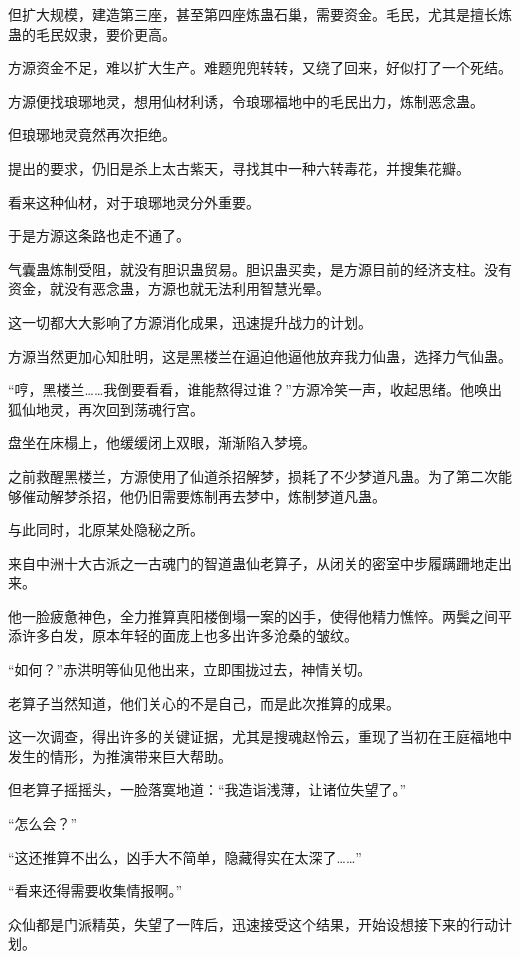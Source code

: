 \begin{this_body}
但扩大规模，建造第三座，甚至第四座炼蛊石巢，需要资金。毛民，尤其是擅长炼蛊的毛民奴隶，要价更高。

方源资金不足，难以扩大生产。难题兜兜转转，又绕了回来，好似打了一个死结。

方源便找琅琊地灵，想用仙材利诱，令琅琊福地中的毛民出力，炼制恶念蛊。

但琅琊地灵竟然再次拒绝。

提出的要求，仍旧是杀上太古紫天，寻找其中一种六转毒花，并搜集花瓣。

看来这种仙材，对于琅琊地灵分外重要。

于是方源这条路也走不通了。

气囊蛊炼制受阻，就没有胆识蛊贸易。胆识蛊买卖，是方源目前的经济支柱。没有资金，就没有恶念蛊，方源也就无法利用智慧光晕。

这一切都大大影响了方源消化成果，迅速提升战力的计划。

方源当然更加心知肚明，这是黑楼兰在逼迫他逼他放弃我力仙蛊，选择力气仙蛊。

“哼，黑楼兰……我倒要看看，谁能熬得过谁？”方源冷笑一声，收起思绪。他唤出狐仙地灵，再次回到荡魂行宫。

盘坐在床榻上，他缓缓闭上双眼，渐渐陷入梦境。

之前救醒黑楼兰，方源使用了仙道杀招解梦，损耗了不少梦道凡蛊。为了第二次能够催动解梦杀招，他仍旧需要炼制再去梦中，炼制梦道凡蛊。

与此同时，北原某处隐秘之所。

来自中洲十大古派之一古魂门的智道蛊仙老算子，从闭关的密室中步履蹒跚地走出来。

他一脸疲惫神色，全力推算真阳楼倒塌一案的凶手，使得他精力憔悴。两鬓之间平添许多白发，原本年轻的面庞上也多出许多沧桑的皱纹。

“如何？”赤洪明等仙见他出来，立即围拢过去，神情关切。

老算子当然知道，他们关心的不是自己，而是此次推算的成果。

这一次调查，得出许多的关键证据，尤其是搜魂赵怜云，重现了当初在王庭福地中发生的情形，为推演带来巨大帮助。

但老算子摇摇头，一脸落寞地道：“我造诣浅薄，让诸位失望了。”

“怎么会？”

“这还推算不出么，凶手大不简单，隐藏得实在太深了……”

“看来还得需要收集情报啊。”

众仙都是门派精英，失望了一阵后，迅速接受这个结果，开始设想接下来的行动计划。


\end{this_body}
